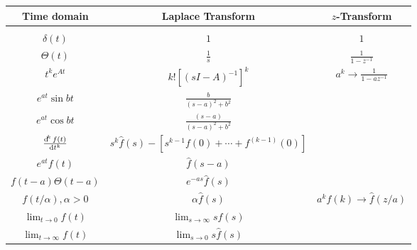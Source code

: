 \documentclass{report}
\begin{document}
\begin{tabular}{c | c | c}
  Time domain                   & Laplace Transform    & $z$-Transform \\
  \hline  \\
  $\delta(t)$                   & $1$                           & $1$ \\
  $\Theta(t)$                   & $\frac{1}{s}$                 & $\frac{1}{1 - z^{-1}}$ \\
  $t^k e^{At}$                   & $k! [(sI - A)^{-1}]^k$         & $a^k \to \frac{1}{1 - az^{-1}}$ \\
  $e^{at} \sin bt$               & $\frac{b}{(s-a)^2 + b^2}$     & \\
  $e^{at} \cos bt$               & $\frac{(s-a)}{(s-a)^2 + b^2}$ & \\
  $\frac{\dif^k f(t)}{\dif t^k}$ & $s^k \hat{f}(s)
                                 - [s^{k-1} f(0) + \cdots + f^{(k-1)}(0)]$ & \\
  $e^{at} f(t)$                  & $\hat{f}(s - a)$               & \\
  $f(t - a)\Theta(t - a)$       & $e^{-as} \hat{f}(s)$            & \\
  $f(t / \alpha), \alpha > 0$   & $\alpha \hat{f}(s)$            & $a^k f(k) \to \hat{f}(z / a)$\\
  $\lim_{t \to 0} f(t)$           & $\lim_{s \to \infty} s\hat{f}(s)$ & \\
  $\lim_{t \to \infty} f(t)$       & $\lim_{s \to 0} s\hat{f}(s)$     &
\end{tabular}
\end{document}
